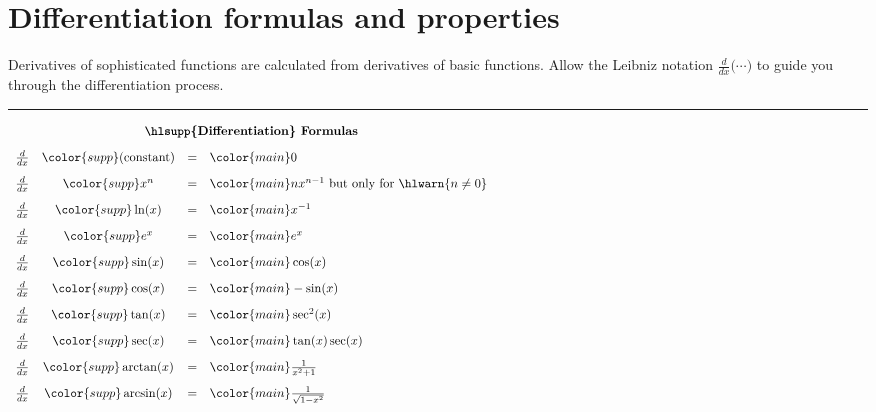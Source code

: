 \documentclass[../main.tex]{subfiles}
\begin{document}
 \section{Differentiation formulas and properties} \label{lesson:differentiation-formulas}
Derivatives of sophisticated functions are calculated from derivatives of basic functions. Allow the Leibniz notation \(\frac{d}{dx} \bigg( \cdots \bigg)\) to guide you through the differentiation process.

\medskip\hrule

\[
  \begin{array}{rccll}
    \multicolumn{4}{c}{\text{\textbf{\hlsupp{Differentiation} Formulas}}} & \hspace{4in} \\[2ex]
    \frac{d}{dx} & {\color{supp} (\text{constant})  } &=& {\color{main} 0}
    & \hspace{4in} \\[2ex]
    \frac{d}{dx} & {\color{supp} x^{n}   } &=& {\color{main} n x^{n - 1}} \text{ but only for } {\hlwarn{n \ne 0}}
    & \hspace{4in} \\[2ex]
    \frac{d}{dx} & {\color{supp} \ln(x)    } &=& {\color{main} x^{-1}}
    & \hspace{4in} \\[2ex]
    \frac{d}{dx} & {\color{supp} e^{x}     } &=& {\color{main} e^{x}}
    & \hspace{4in} \\[2ex]
    \frac{d}{dx} & {\color{supp} \sin(x)   } &=& {\color{main} \cos(x)}
    & \hspace{4in} \\[2ex]
    \frac{d}{dx} & {\color{supp} \cos(x)   } &=& {\color{main} -\sin(x)}
    & \hspace{4in} \\[2ex]
    \frac{d}{dx} & {\color{supp} \tan(x)   } &=& {\color{main} \sec^{2}(x)}
    & \hspace{4in} \\[2ex]
    \frac{d}{dx} & {\color{supp} \sec(x)   } &=& {\color{main} \tan(x)\sec(x)}
    & \hspace{4in} \\[2ex]
    \frac{d}{dx} & {\color{supp} \arctan(x)} &=& {\color{main} \frac{1}{x^{2}+1}}
    & \hspace{4in} \\[2ex]
    \frac{d}{dx} & {\color{supp} \arcsin(x)} &=& {\color{main} \frac{1}{\sqrt{1 - x^{2}}}}
    & \hspace{4in}
  \end{array}
\]
\end{document}
